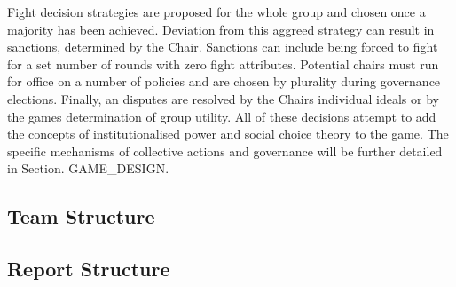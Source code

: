 Fight decision strategies are proposed for the whole group and chosen once a majority has been achieved. Deviation from this aggreed strategy can result in sanctions, determined by the Chair. Sanctions can include being forced to fight for a set number of rounds with zero fight attributes. Potential chairs must run for office on a number of policies and are chosen by plurality during governance elections. Finally, an disputes are resolved by the Chairs individual ideals or by the games determination of group utility. All of these decisions attempt to add the concepts of institutionalised power and social choice theory to the game. The specific mechanisms of collective actions and governance will be further detailed in Section. GAME\_DESIGN.



\subsection{Team Structure}\label{sec:team struct}


\subsection{Report Structure}\label{sec:report struct}

% 
